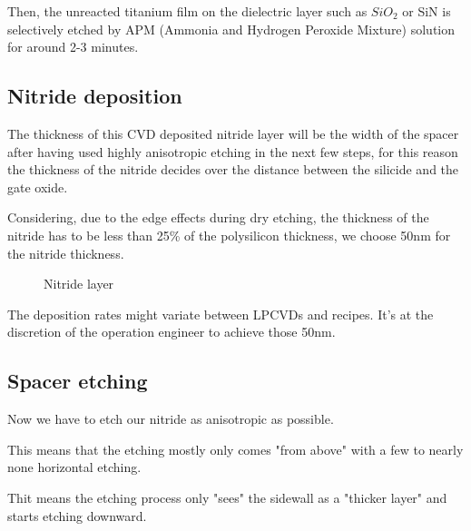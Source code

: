 Then, the unreacted titanium film on the dielectric layer such as $SiO_2$ or SiN is selectively etched by APM (Ammonia and Hydrogen Peroxide Mixture) solution for around 2-3 minutes.

\newpage

\subsection{Nitride deposition}\label{nitride_spacers_deposition}

The thickness of this CVD deposited nitride layer will be the width of the spacer after having used highly anisotropic etching in the next few steps, for this reason the thickness of the nitride decides over the distance between the silicide and the gate oxide.

Considering, due to the edge effects during dry etching, the thickness of the nitride has to be less than 25\% of the polysilicon thickness, we choose 50nm for the nitride thickness.

\begin{figure}[H]
	\centering
	\begin{tikzpicture}[node distance = 3cm, auto, thick,scale=\CrossSectionOnly, every node/.style={transform shape}]
		
	\end{tikzpicture}
	\begin{tikzpicture}[node distance = 3cm, auto, thick,scale=\CrossSectionOnly, every node/.style={transform shape}]
		
	\end{tikzpicture}
	\caption{Nitride layer}
\end{figure}

The deposition rates might variate between LPCVDs and recipes. It's at the discretion of the operation engineer to achieve those 50nm.

\newpage

\subsection{Spacer etching}

Now we have to etch our nitride as anisotropic as possible.

This means that the etching mostly only comes "from above" with a few to nearly none horizontal etching.

Thit means the etching process only "sees" the sidewall as a "thicker layer" and starts etching downward.

